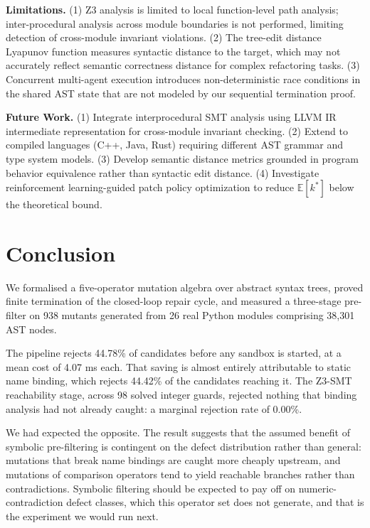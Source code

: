 \documentclass[10pt,twocolumn,letterpaper]{article}
\begin{document}
\textbf{Limitations.} (1) Z3 analysis is limited to local function-level path analysis; inter-procedural analysis across module boundaries is not performed, limiting detection of cross-module invariant violations. (2) The tree-edit distance Lyapunov function measures syntactic distance to the target, which may not accurately reflect semantic correctness distance for complex refactoring tasks. (3) Concurrent multi-agent execution introduces non-deterministic race conditions in the shared AST state that are not modeled by our sequential termination proof.

\textbf{Future Work.} (1) Integrate interprocedural SMT analysis using LLVM IR intermediate representation for cross-module invariant checking. (2) Extend to compiled languages (C++, Java, Rust) requiring different AST grammar and type system models. (3) Develop semantic distance metrics grounded in program behavior equivalence rather than syntactic edit distance. (4) Investigate reinforcement learning-guided patch policy optimization to reduce $\mathbb{E}[k^*]$ below the theoretical bound.




\section{Conclusion}


We formalised a five-operator mutation algebra over abstract syntax trees, proved finite termination of the closed-loop repair cycle, and measured a three-stage pre-filter on 938 mutants generated from 26 real Python modules comprising 38{,}301 AST nodes.

The pipeline rejects 44.78\% of candidates before any sandbox is started, at a mean cost of 4.07 ms each. That saving is almost entirely attributable to static name binding, which rejects 44.42\% of the candidates reaching it. The Z3-SMT reachability stage, across 98 solved integer guards, rejected nothing that binding analysis had not already caught: a marginal rejection rate of 0.00\%.

We had expected the opposite. The result suggests that the assumed benefit of symbolic pre-filtering is contingent on the defect distribution rather than general: mutations that break name bindings are caught more cheaply upstream, and mutations of comparison operators tend to yield reachable branches rather than contradictions. Symbolic filtering should be expected to pay off on numeric-contradiction defect classes, which this operator set does not generate, and that is the experiment we would run next.
\end{document}
